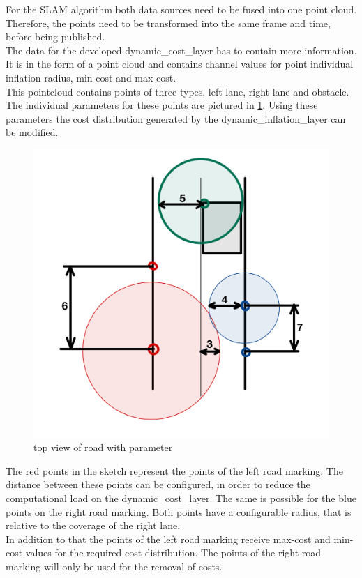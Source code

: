 For the SLAM algorithm both data sources need to be fused into one point cloud. Therefore, the points need to be transformed into the same frame and time, before being published.\\

The data for the developed dynamic\_cost\_layer has to contain more information. It is in the form of a point cloud and contains channel values for point individual inflation radius, min-cost and max-cost.\\ 

This pointcloud contains points of three types, left lane, right lane and obstacle.
The individual parameters for these points are pictured in \ref{markparams}. Using these parameters the cost distribution generated by the dynamic\_inflation\_layer can be modified.\\

\begin{figure}[H]
	\centering
	\includegraphics[width=.7\textwidth]{Pictures/markfreespace parameter erklaerung}
	\caption{top view of road with parameter}
	\label{markparams}
\end{figure}

The red points in the sketch represent the points of the left road marking. The distance between these points can be configured, in order to reduce the computational load on the dynamic\_cost\_layer. The same is possible for the blue points on the right road marking. Both points have a configurable radius, that is relative to the coverage of the right lane.\\
In addition to that the points of the left road marking receive max-cost and min-cost values for the required cost distribution. The points of the right road marking will only be used for the removal of costs.\\

